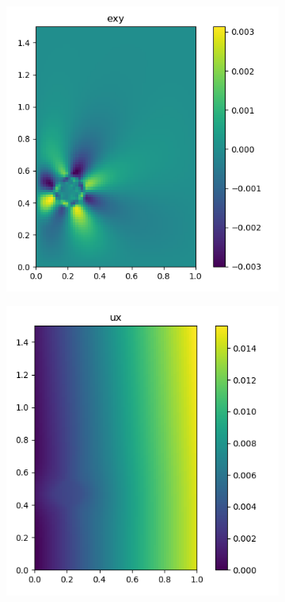 \documentclass[12pt]{article}
\begin{document}
\begin{figure}[h]
\begin{subfigure}[b]{0.25\linewidth}
  \end{subfigure}
  \begin{subfigure}[b]{0.25\linewidth}
    \includegraphics[totalheight=4cm]{Figures/dispstrainfields/exy11_fypy.png}
  \end{subfigure}
  \begin{subfigure}[b]{0.25\linewidth}
    \includegraphics[totalheight=4cm]{Figures/dispstrainfields/ux11_fypy.png}

\end{subfigure}
\end{figure}
\end{document}
